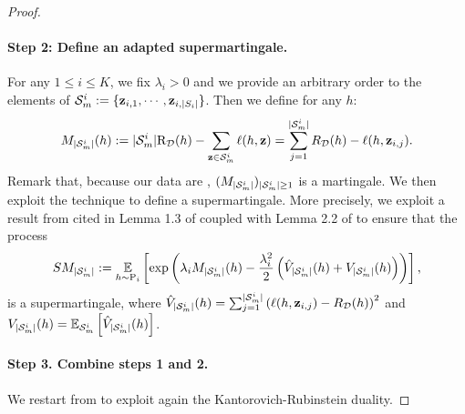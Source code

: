 \begin{noaddcontents}
\begin{proof}
    \paragraph{Step 2: Define an adapted supermartingale.}
        For any $1\leq i \leq K$, we fix $\lambda_i>0$ and we provide an arbitrary order to the elements of $\mathcal{S}_m^{i}:= \{\mathbf{z}_{i,1},\cdots,\mathbf{z}_{i,|S_i|}\}$. Then we define for any $h$: 
        \begin{align*}
        M_{|\mathcal{S}_m^{i}|}(h):=   |\mathcal{S}_m^{i}|\text{R}_{\mathcal{D}}(h) - \sum_{\mathbf{z}\in\mathcal{S}_m^{i}} \ell(h, \mathbf{z}) = \sum_{j=1}^{|\mathcal{S}_m^{i}|} R_{\mathcal{D}}(h) - \ell(h,\mathbf{z}_{i,j}).
        \end{align*}
        Remark that, because our data are \iid, $(M_{|\mathcal{S}_m^{i}|})_{|\mathcal{S}_m^{i}|\geq 1}$ is a martingale.
        We then exploit the technique  to define a supermartingale.
        More precisely, we exploit a result from \cite{bercu2008exponential} cited in Lemma 1.3 of  coupled with Lemma 2.2 of  to ensure that the process
        \begin{align*}
        SM_{|\mathcal{S}_m^{i}|} := \operatorname*{\mathbb{E}}_{h\sim \mathrm{P}_i} \left[\exp\left(\lambda_i M_{|\mathcal{S}_m^{i}|}(h) - \frac{\lambda_i^2}{2}\left( \hat{V}_{|\mathcal{S}_m^{i}|}(h) + V_{|\mathcal{S}_m^{i}|}(h) \right)\right)\right],
        \end{align*}
        is a supermartingale, where $\hat{V}_{|\mathcal{S}_m^{i}|}(h)= \sum_{j=1}^{|\mathcal{S}_m^{i}|} \left(\ell(h,\mathbf{z}_{i,j}) - R_{\mathcal{D}}(h)\right)^2$ and $V_{|\mathcal{S}_m^{i}|}(h) = \operatorname*{\mathbb{E}}_{\mathcal{S}_m^{i}} \left[ \hat{V}_{|\mathcal{S}_m^{i}|}(h) \right] $.
    
    
    
    \paragraph{Step 3. Combine steps 1 and 2.}
        
        We restart from  to exploit again the Kantorovich-Rubinstein duality.
    

\end{proof}
\end{noaddcontents}
